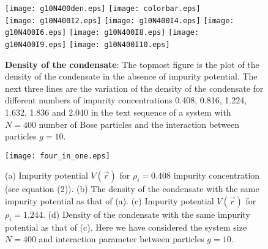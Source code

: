 \documentclass[amsmath,amssymb,lengthcheck,aps,prl] {revtex4}
\begin{document}
\begin{figure}
  \begin{center}
    \texttt{[image: g10N400den.eps]}  
    \texttt{[image: colorbar.eps]} \\
    \texttt{[image: g10N400I2.eps]} 
    \texttt{[image: g10N400I4.eps]} 
        \texttt{[image: g10N400I6.eps]} 
            \texttt{[image: g10N400I8.eps]} 
            \texttt{[image: g10N400I9.eps]} 
                \texttt{[image: g10N400I10.eps]} 
\caption{ \textbf{Density of the condensate}: The topmost figure is the plot of the density of the condensate in the absence of impurity potential. The next three lines are the variation of the density of the condensate for different numbers of impurity concentrations 0.408, 0.816, 1.224, 1.632, 1.836 and  2.040  in the text sequence of a system with $N=400$ number of Bose particles and the interaction between particles $g=10$.}
    \label{fig:2Dg10den}
  \end{center}
\end{figure}
\begin{figure}
  \begin{center}
\texttt{[image: four\_in\_one.eps]}
	  \caption{ (a) Impurity potential $V(\vec{r})$ for $\rho_i = 0.408$ impurity concentration (see equation (2)). (b) The density of the condensate with the same impurity potential as that of (a).  (c) Impurity potential $V(\vec{r})$ for $\rho_i= 1.244$. (d) Density of the condensate with the same impurity potential as that of (c). Here we have considered the system size $N=400$ and interaction parameter between particles $g=10$.}
    \label{fig:2Dpotl}
  \end{center}
\end{figure}
\end{document}
